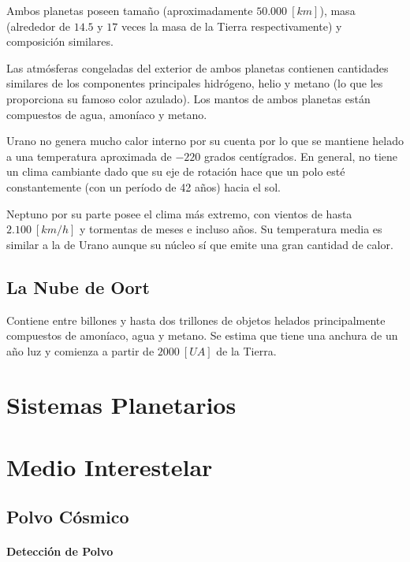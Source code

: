 \documentclass{tufte-handout}
\begin{document}
Ambos planetas poseen tamaño (aproximadamente $50.000~[km]$), masa (alrededor de $14.5$ y $17$ veces la masa de la Tierra respectivamente) y composición similares.

Las atmósferas congeladas del exterior de ambos planetas contienen cantidades similares de los componentes principales hidrógeno, helio y metano (lo que les proporciona su famoso color azulado). Los mantos de ambos planetas están compuestos de agua, amoníaco y metano.

Urano no genera mucho calor interno por su cuenta por lo que se mantiene helado a una temperatura aproximada de $-220$ grados centígrados. En general, no tiene un clima cambiante dado que su eje de rotación hace que un polo esté constantemente (con un período de 42 años) hacia el sol.

Neptuno por su parte posee el clima más extremo, con vientos de hasta $2.100~[km/h]$ y tormentas de meses e incluso años. Su temperatura media es similar a la de Urano aunque su núcleo sí que emite una gran cantidad de calor.

\subsection{La Nube de Oort}

Contiene entre billones y hasta dos trillones de objetos helados principalmente compuestos de amoníaco, agua y metano. Se estima que tiene una anchura de un año luz y comienza a partir de $2000~[UA]$ de la Tierra.

\clearpage

\section{Sistemas Planetarios}

\clearpage

\section{Medio Interestelar}

\subsection{Polvo Cósmico}

\paragraph{Detección de Polvo}
\end{document}
